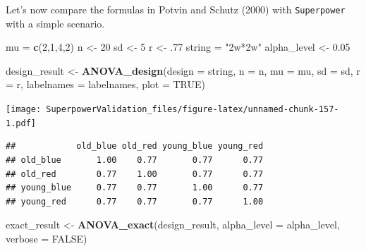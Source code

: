 \documentclass[]{book}
\newenvironment{Shaded}{\begin{snugshade}}{\end{snugshade}}
\newcommand{\DataTypeTok}[1]{\textcolor[rgb]{0.13,0.29,0.53}{#1}}
\newcommand{\DecValTok}[1]{\textcolor[rgb]{0.00,0.00,0.81}{#1}}
\newcommand{\FloatTok}[1]{\textcolor[rgb]{0.00,0.00,0.81}{#1}}
\newcommand{\KeywordTok}[1]{\textcolor[rgb]{0.13,0.29,0.53}{\textbf{#1}}}
\newcommand{\NormalTok}[1]{#1}
\newcommand{\OperatorTok}[1]{\textcolor[rgb]{0.81,0.36,0.00}{\textbf{#1}}}
\newcommand{\OtherTok}[1]{\textcolor[rgb]{0.56,0.35,0.01}{#1}}
\newcommand{\StringTok}[1]{\textcolor[rgb]{0.31,0.60,0.02}{#1}}
\begin{document}
Let's now compare the formulas in Potvin and Schutz (2000) with \texttt{Superpower} with a simple scenario.

\begin{Shaded}
\begin{Highlighting}[]
\NormalTok{mu =}\StringTok{ }\KeywordTok{c}\NormalTok{(}\DecValTok{2}\NormalTok{,}\DecValTok{1}\NormalTok{,}\DecValTok{4}\NormalTok{,}\DecValTok{2}\NormalTok{) }
\NormalTok{n <-}\StringTok{ }\DecValTok{20}
\NormalTok{sd <-}\StringTok{ }\DecValTok{5}
\NormalTok{r <-}\StringTok{ }\FloatTok{.77}
\NormalTok{string =}\StringTok{ "2w*2w"}
\NormalTok{alpha_level <-}\StringTok{ }\FloatTok{0.05}


\NormalTok{design_result <-}\StringTok{ }\KeywordTok{ANOVA_design}\NormalTok{(}\DataTypeTok{design =}\NormalTok{ string,}
                              \DataTypeTok{n =}\NormalTok{ n, }
                              \DataTypeTok{mu =}\NormalTok{ mu, }
                              \DataTypeTok{sd =}\NormalTok{ sd, }
                              \DataTypeTok{r =}\NormalTok{ r, }
                              \DataTypeTok{labelnames =}\NormalTok{ labelnames,}
                              \DataTypeTok{plot =} \OtherTok{TRUE}\NormalTok{)}
\end{Highlighting}
\end{Shaded}

\texttt{[image: SuperpowerValidation\_files/figure-latex/unnamed-chunk-157-1.pdf]}

\begin{Shaded}
\end{Shaded}

\begin{verbatim}
##            old_blue old_red young_blue young_red
## old_blue       1.00    0.77       0.77      0.77
## old_red        0.77    1.00       0.77      0.77
## young_blue     0.77    0.77       1.00      0.77
## young_red      0.77    0.77       0.77      1.00
\end{verbatim}

\begin{Shaded}
\begin{Highlighting}[]
\NormalTok{exact_result <-}\StringTok{ }\KeywordTok{ANOVA_exact}\NormalTok{(design_result,}
                            \DataTypeTok{alpha_level =}\NormalTok{ alpha_level,}
                            \DataTypeTok{verbose =} \OtherTok{FALSE}\NormalTok{)}
\end{Highlighting}
\end{Shaded}
\end{document}
